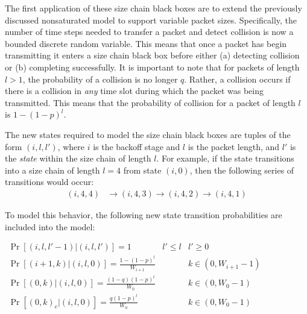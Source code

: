\documentclass[conference]{IEEEtran}
\begin{document}
The first application of these size chain black boxes are to extend the previously discussed nonsaturated model to support variable packet sizes. Specifically, the number of time steps needed to transfer a packet and detect collision is now a bounded discrete random variable. This means that once a packet has begin transmitting it enters a size chain black box before either (a) detecting collision or (b) completing successfully. It is important to note that for packets of length $l > 1$, the probability of a collision is no longer $q$. Rather, a collision occurs if there is a collision in \emph{any} time slot during which the packet was being transmitted. This means that the probability of collision for a packet of length $l$ is $1 - (1 - p)^l$. 

The new states required to model the size chain black boxes are tuples of the form $(i, l, l')$, where $i$ is the backoff stage and $l$ is the packet length, and $l'$ is the \emph{state} within the size chain of length $l$. For example, if the state transitions into a size chain of length $l = 4$ from state $(i, 0)$, then the following series of transitions would occur: 
\begin{align*}
(i, 4, 4) & \to (i, 4, 3) \to (i, 4, 2) \to (i, 4, 1)
\end{align*}
\vspace{-1em}

To model this behavior, the following new state transition probabilities are included into the model:

\vspace{-1em}
\begin{center}
\begin{math}
\begin{array}{lll}
\Pr[(i,l,l'-1) | (i,l,l')] = 1 & l' \leq l & l' \geq 0 \\
\Pr[(i+1,k) | (i,l,0)] = \frac{1 - (1 - p)^l}{W_{i+1}} & ~ & k \in (0, W_{i+1} - 1) \\
\Pr[(0,k) | (i,l,0)] = \frac{(1 - q)(1 - p)^l}{W_0} & ~ & k \in (0, W_{0} - 1) \\
\Pr[(0,k)_e | (i,l,0)] = \frac{q(1 - p)^l}{W_0} & ~ & k \in (0, W_{0} - 1) \\
\end{array}
\end{math}
\end{center}
\vspace{-1em}
\end{document}
